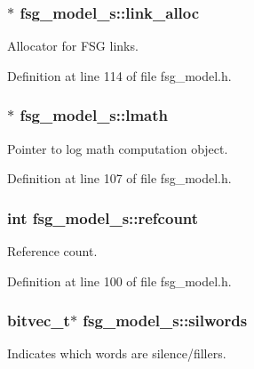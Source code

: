 \subsubsection[{link\-\_\-alloc}]{$\ast$ fsg\-\_\-model\-\_\-s\-::link\-\_\-alloc}\label{structfsg__model__s_ac4e2a36305bbe62a5c7468588eb058b1}


Allocator for F\-S\-G links. 



Definition at line 114 of file fsg\-\_\-model.\-h.

\subsubsection[{lmath}]{$\ast$ fsg\-\_\-model\-\_\-s\-::lmath}\label{structfsg__model__s_ab0b22dadb593ee1901829f89c4a47fe2}


Pointer to log math computation object. 



Definition at line 107 of file fsg\-\_\-model.\-h.

\subsubsection[{refcount}]{\setlength{\rightskip}{0pt plus 5cm}int fsg\-\_\-model\-\_\-s\-::refcount}\label{structfsg__model__s_af329127556a42f6ea3b27f41a99a0b17}


Reference count. 



Definition at line 100 of file fsg\-\_\-model.\-h.

\subsubsection[{silwords}]{\setlength{\rightskip}{0pt plus 5cm}bitvec\-\_\-t$\ast$ fsg\-\_\-model\-\_\-s\-::silwords}\label{structfsg__model__s_ab5709e67c1b7506ab024f2060d50331c}


Indicates which words are silence/fillers. 



